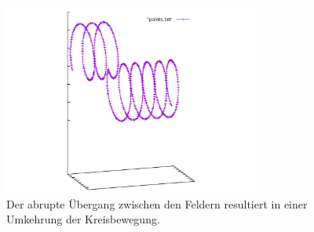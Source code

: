 \begin{figure}[h]
  \centering
  \includegraphics[width=0.75\textwidth]{../gnuplot/two_fields}
  \caption{Der abrupte \"Ubergang zwischen den Feldern resultiert in einer Umkehrung der Kreisbewegung.}
  \label{fig:two_fields}
\end{figure}
